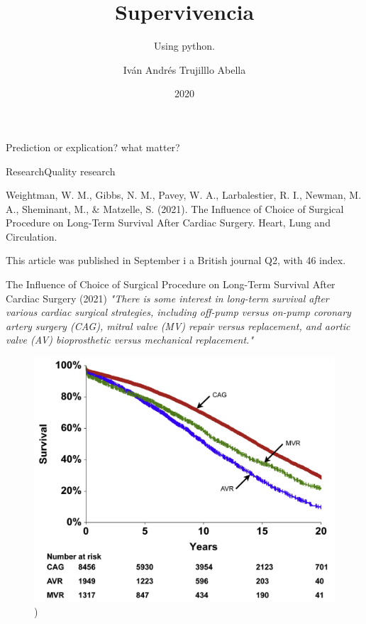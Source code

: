 \documentclass{beamer}
\institute{Javeriana}
\date{2020}
\title[Pontificia Universidad Javeriana] %
{Supervivencia}
\subtitle{ Using python.}
\author[Iván Andrés Trujillo] 
{
Iván Andrés Trujilllo Abella}
\institute[] 
{
  Facultad de Ingenieria\\
  Pontificia Universidad Javeriana
  \and
  
\textbf{ trujilloiv@javeriana.edu.co }
}
\date[MINTA] %
\begin{document}
\frame{\titlepage}




\begin{frame}
Prediction or explication?
what matter?
\end{frame}

\begin{frame}{Research}{Quality research}

Weightman, W. M., Gibbs, N. M., Pavey, W. A., Larbalestier, R. I., Newman, M. A., Sheminant, M., & Matzelle, S. (2021). The Influence of Choice of Surgical Procedure on Long-Term Survival After Cardiac Surgery. Heart, Lung and Circulation.

This article was published in September i a British journal Q2, with 46 index.  

\end{frame}

\begin{frame}{ The Influence of Choice of Surgical Procedure on Long-Term Survival After Cardiac Surgery (2021)}
\textit{
"There is some interest in long-term survival after various cardiac surgical strategies, including off-pump versus on-pump coronary artery surgery (CAG), mitral valve (MV) repair versus replacement, and aortic valve (AV) bioprosthetic versus mechanical replacement."}
\end{frame}



\begin{frame}
\begin{figure}
  \centering
    \includegraphics[width=0.999\textwidth]{article-image.jpg}
  \caption{)}
  \label{Tabla 2 (del documento)}
\end{figure}

\end{frame}
\end{document}
